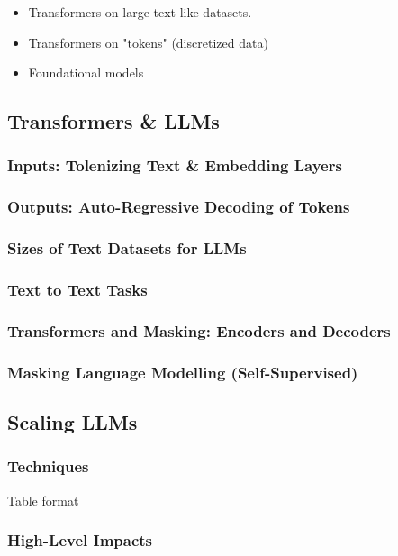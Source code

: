 \begin{notes}
    \begin{itemize}
        \item Transformers on large text-like datasets.
        \item Transformers on "tokens" (discretized data)
        \item Foundational models
    \end{itemize}
\end{notes}

\subsection{Transformers \& LLMs}
\begin{summary}
\end{summary}

\subsubsection{Inputs: Tolenizing Text \& Embedding Layers}

\subsubsection{Outputs: Auto-Regressive Decoding of Tokens}

\subsubsection{Sizes of Text Datasets for LLMs}

\subsubsection{Text to Text Tasks}

\subsubsection{Transformers and Masking: Encoders and Decoders}

\subsubsection{Masking Language Modelling (Self-Supervised)}
\newpage

\subsection{Scaling LLMs}
\begin{motivation}
    
\end{motivation}

\subsubsection{Techniques}
\begin{summary}
    Table format
\end{summary}

\subsubsection{High-Level Impacts}
\begin{summary}

\end{summary}